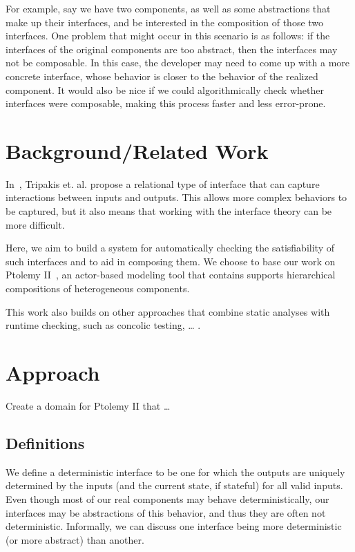 \documentclass[preprint,11pt]{sigplanconf}
\begin{document}
For example, say we have two components, as well as some abstractions that
make up their interfaces, and be interested in the composition of those two
interfaces. One problem that might occur in this scenario is as follows: if the
interfaces of the original components are too abstract, then the interfaces
may not be composable. In this case, the developer may need to come up with a
more concrete interface, whose behavior is closer to the behavior of the
realized component. It would also be nice if we could algorithmically check
whether interfaces were composable, making this process faster and less
error-prone.

\section{Background/Related Work}
In~\cite{relationalInterfaces}, Tripakis et. al. propose a relational type of
interface that can capture interactions between inputs and outputs.
This allows more complex behaviors to be captured, but it also means that
working with the interface theory can be more difficult.

Here, we aim to build a system for automatically checking the satisfiability
of such interfaces and to aid in composing them.
We choose to base our work on Ptolemy II~\cite{ptII}, an actor-based modeling
tool that contains supports hierarchical compositions of heterogeneous components.


This work also builds on other approaches that combine static analyses with
runtime checking, such as concolic testing, \dots
{}.

\section{Approach}
Create a domain for Ptolemy II that \dots

\subsection{Definitions}
We define a deterministic interface to be one for which the outputs are
uniquely determined by the inputs (and the current state, if stateful) for all
valid inputs.
Even though most of our real components may behave deterministically, our
interfaces may be abstractions of this behavior, and thus they are often not
deterministic.
Informally, we can discuss one interface being more deterministic (or more
abstract) than another.
\end{document}
